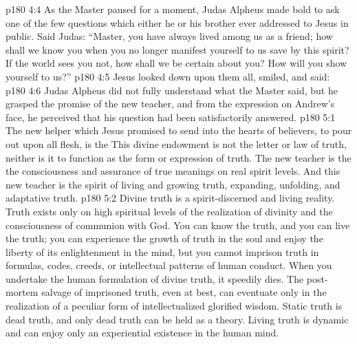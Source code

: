 \vs p180 4:4 As the Master paused for a moment, Judas Alpheus made bold to ask one of the few questions which either he or his brother ever addressed to Jesus in public. Said Judas: “Master, you have always lived among us as a friend; how shall we know you when you no longer manifest yourself to us save by this spirit? If the world sees you not, how shall we be certain about you? How will you show yourself to us?”
\vs p180 4:5 Jesus looked down upon them all, smiled, and said: 
\vs p180 4:6 Judas Alpheus did not fully understand what the Master said, but he grasped the promise of the new teacher, and from the expression on Andrew’s face, he perceived that his question had been satisfactorily answered.
\vs p180 5:1 The new helper which Jesus promised to send into the hearts of believers, to pour out upon all flesh, is the  This divine endowment is not the letter or law of truth, neither is it to function as the form or expression of truth. The new teacher is the  the consciousness and assurance of true meanings on real spirit levels. And this new teacher is the spirit of living and growing truth, expanding, unfolding, and adaptative truth.
\vs p180 5:2 Divine truth is a spirit\hyp{}discerned and living reality. Truth exists only on high spiritual levels of the realization of divinity and the consciousness of communion with God. You can know the truth, and you can live the truth; you can experience the growth of truth in the soul and enjoy the liberty of its enlightenment in the mind, but you cannot imprison truth in formulas, codes, creeds, or intellectual patterns of human conduct. When you undertake the human formulation of divine truth, it speedily dies. The post\hyp{}mortem salvage of imprisoned truth, even at best, can eventuate only in the realization of a peculiar form of intellectualized glorified wisdom. Static truth is dead truth, and only dead truth can be held as a theory. Living truth is dynamic and can enjoy only an experiential existence in the human mind.
